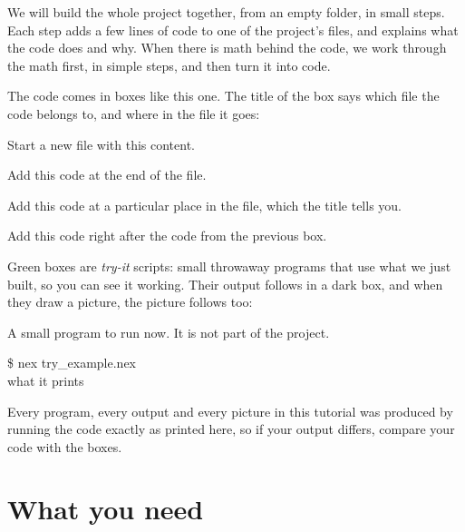 We will build the whole project together, from an empty folder, in small
steps. Each step adds a few lines of code to one of the project's files,
and explains what the code does and why. When there is math behind the
code, we work through the math first, in simple steps, and then turn it
into code.

The code comes in boxes like this one. The title of the box says which
file the code belongs to, and where in the file it goes:

\begin{tcolorbox}[codebox, title={\textbf{New file}\enspace\texttt{example.nex}}]
\small Start a new file with this content.
\end{tcolorbox}
\begin{tcolorbox}[codebox, title={\texttt{example.nex}\enspace\textendash\enspace add at the end}]
\small Add this code at the end of the file.
\end{tcolorbox}
\begin{tcolorbox}[codebox, title={\texttt{example.nex}\enspace\textendash\enspace add before the line ...}]
\small Add this code at a particular place in the file, which the title tells you.
\end{tcolorbox}
\begin{tcolorbox}[codebox, title={\texttt{example.nex}\enspace\textendash\enspace continued}]
\small Add this code right after the code from the previous box.
\end{tcolorbox}

Green boxes are \emph{try-it} scripts: small throwaway programs that use
what we just built, so you can see it working. Their output follows in a
dark box, and when they draw a picture, the picture follows too:

\begin{tcolorbox}[trybox, title={\textbf{Try it}\enspace\texttt{try\_example.nex}}]
\small A small program to run now. It is not part of the project.
\end{tcolorbox}
\begin{tcolorbox}[outbox]
{\ttfamily\footnotesize\color{outfg}\$ nex try\_example.nex\\what it prints}
\end{tcolorbox}

Every program, every output and every picture in this tutorial was
produced by running the code exactly as printed here, so if your output
differs, compare your code with the boxes.

\section{What you need}

